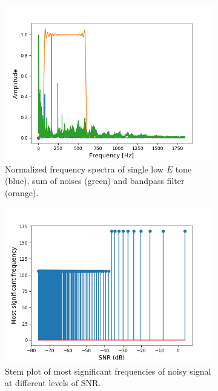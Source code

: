 \begin{figure}[H]
\begin{subfigure}{0.49\textwidth}
\centering
\includegraphics[width=\textwidth]{figures/SNR/single_spectrum.png}
\caption{Normalized frequency spectra of single low $E$ tone (blue), sum of noises (green) and bandpass filter (orange).}
\label{fig:single_spectrum}
\end{subfigure}
\begin{subfigure}{0.49\textwidth}
\centering
\includegraphics[width=\textwidth]{figures/SNR/single_stem.png}
\caption{Stem plot of most significant frequencies of noisy signal at different levels of SNR.}
\label{fig:single_stem}
\end{subfigure}
\caption{}
\label{fig:single_noise}
\end{figure}


